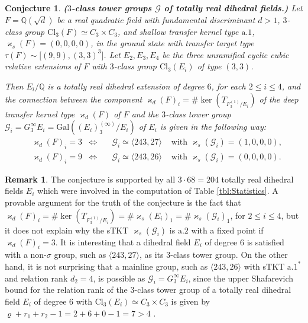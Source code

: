 \documentclass{amsart}
\newtheorem{conjecture}{Conjecture}[section]
\theoremstyle{definition}
\newtheorem{remark}{Remark}[section]
\numberwithin{equation}{section}
\begin{document}
\begin{conjecture}
\label{cnj:Dihedral}
\textbf{(\(3\)-class tower groups \(\mathcal{G}\) of totally real dihedral fields.)}
Let \(F=\mathbb{Q}(\sqrt{d})\) be a real quadratic field
with fundamental discriminant \(d>1\),
\(3\)-class group \(\mathrm{Cl}_3(F)\simeq C_3\times C_3\),
and shallow transfer kernel type \(\mathrm{a}.1\), \(\varkappa_s(F)=(0,0,0,0)\),
in the ground state with transfer target type \(\tau(F)\sim\lbrack (9,9),(3,3)^3\rbrack\).
Let \(E_2,E_3,E_4\) be the three unramified cyclic cubic relative extensions of \(F\)
with \(3\)-class group \(\mathrm{Cl}_3(E_i)\) of type \((3,3)\).

Then \(E_i/\mathbb{Q}\) is a totally real dihedral extension of degree \(6\),
for each \(2\le i\le 4\),
and the connection between the component \(\varkappa_d(F)_i=\#\ker(T_{F_3^{(1)}/E_i})\)
of the deep transfer kernel type \(\varkappa_d(F)\) of \(F\)
and the \(3\)-class tower group \(\mathcal{G}_i=G_3^\infty{E_i}=\mathrm{Gal}((E_i)_3^{(\infty)}/E_i)\) of \(E_i\)
is given in the following way:
\begin{equation}
\label{eqn:Dihedral}
\begin{aligned}
 & \varkappa_d(F)_i=3 & \Longleftrightarrow & \quad\mathcal{G}_i\simeq\langle 243,27\rangle & \text{ with } \varkappa_s(\mathcal{G}_i)=(1,0,0,0), \\
 & \varkappa_d(F)_i=9 & \Longleftrightarrow & \quad\mathcal{G}_i\simeq\langle 243,26\rangle & \text{ with } \varkappa_s(\mathcal{G}_i)=(0,0,0,0).
\end{aligned}
\end{equation}
\end{conjecture}

\begin{remark}
\label{rmk:Dihedral}
The conjecture is supported by all \(3\cdot 68=204\) totally real dihedral fields \(E_i\)
which were involved in the computation of Table
\ref{tbl:Statistics}.
A provable argument for the truth of the conjecture is the fact that
\(\varkappa_d(F)_i=\#\ker(T_{F_3^{(1)}/E_i})=\#\varkappa_s(E_i)_1=\#\varkappa_s(\mathcal{G}_i)_1\),
for \(2\le i\le 4\),
but it does not explain why the sTKT \(\varkappa_s(\mathcal{G}_i)\) is \(\mathrm{a}.2\) with a fixed point if \(\varkappa_d(F)_i=3\).
It is interesting that a dihedral field \(E_i\) of degree \(6\) is satisfied with a non-\(\sigma\) group,
such as \(\langle 243,27\rangle\), as its \(3\)-class tower group.
On the other hand, it is not surprising that a mainline group,
such as \(\langle 243,26\rangle\) with sTKT \(\mathrm{a}.1^\ast\) and relation rank \(d_2=4\), is possible as \(\mathcal{G}_i=G_3^\infty{E_i}\),
since the upper Shafarevich bound for the relation rank of the \(3\)-class tower group
of a totally real dihedral field \(E_i\) of degree \(6\) with \(\mathrm{Cl}_3(E_i)\simeq C_3\times C_3\)
is given by \(\varrho+r_1+r_2-1=2+6+0-1=7>4\)
\cite[Thm. 1.3, p. 75]{Ma15}.
\end{remark}
\end{document}
